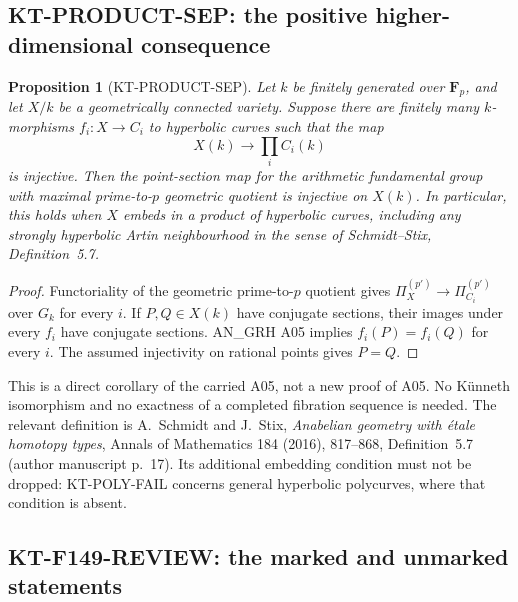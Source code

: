 \documentclass[11pt,a4paper]{article}
\newtheorem{proposition}[theorem]{Proposition}
\theoremstyle{definition}
\begin{document}


\subsection{KT-PRODUCT-SEP: the positive higher-dimensional consequence}
\label{sec:kt-product-sep}

\begin{proposition}[KT-PRODUCT-SEP]
Let $k$ be finitely generated over $\mathbf F_p$, and let $X/k$
be a geometrically connected variety. Suppose there are finitely
many $k$-morphisms $f_i:X\to C_i$ to hyperbolic curves such that
the map
\[
 X(k)\longrightarrow\prod_i C_i(k)
\]
is injective. Then the point-section map for the arithmetic
fundamental group with maximal prime-to-$p$ geometric quotient
is injective on $X(k)$.
In particular, this holds when $X$ embeds in a product of
hyperbolic curves, including any strongly hyperbolic Artin
neighbourhood in the sense of Schmidt--Stix, Definition~5.7.
\end{proposition}

\begin{proof}
Functoriality of the geometric prime-to-$p$ quotient gives
$\Pi_X^{(p')}\to\Pi_{C_i}^{(p')}$ over $G_k$ for every $i$.
If $P,Q\in X(k)$ have conjugate sections, their images under
every $f_i$ have conjugate sections. AN\_GRH A05 implies
$f_i(P)=f_i(Q)$ for every $i$. The assumed injectivity on
rational points gives $P=Q$.
\end{proof}

This is a direct corollary of the carried A05, not a new proof
of A05. No K\"unneth isomorphism and no exactness of a completed
fibration sequence is needed. The relevant definition is
A.~Schmidt and J.~Stix, \emph{Anabelian geometry with \'etale
homotopy types}, Annals of Mathematics 184 (2016), 817--868,
Definition~5.7 (author manuscript p.~17). Its additional
embedding condition must not be dropped: KT-POLY-FAIL concerns
general hyperbolic polycurves, where that condition is absent.




\subsection{KT-F149-REVIEW: the marked and unmarked statements}
\label{sec:kt-f149-review}
\end{document}
